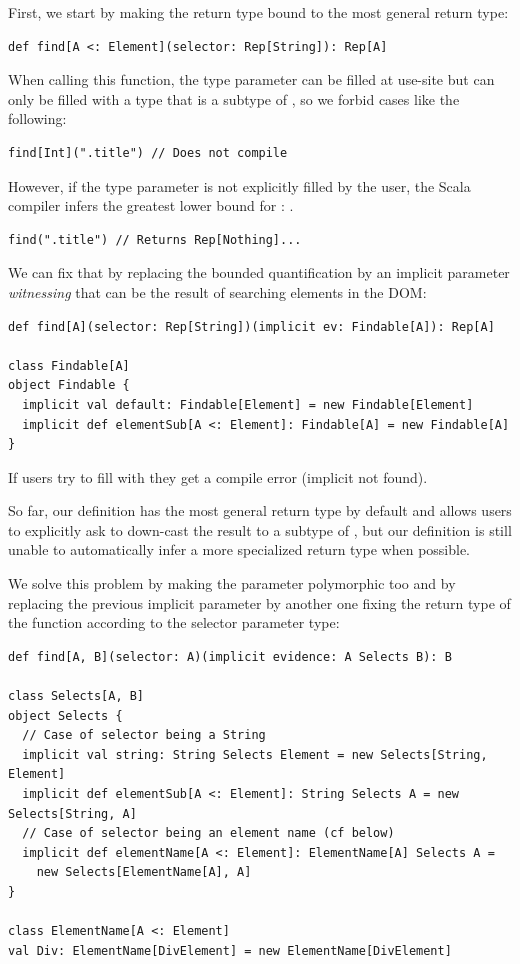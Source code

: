 \documentclass[runningheads,a4paper]{llncs}
\begin{document}
First, we start by making the return type bound to the most general return type:

\begin{lstlisting}
def find[A <: Element](selector: Rep[String]): Rep[A]
\end{lstlisting}

When calling this function, the  type parameter can be filled at use-site but can only be
filled with a type that is a subtype of , so we forbid cases like the following:

\begin{lstlisting}
find[Int](".title") // Does not compile
\end{lstlisting}

However, if the  type parameter is not explicitly filled by the user, the Scala compiler
infers the greatest lower bound for : .

\begin{lstlisting}
find(".title") // Returns Rep[Nothing]...
\end{lstlisting}

We can fix that by replacing the bounded quantification by an implicit parameter \emph{witnessing}
that  can be the result of searching elements in the DOM:

\begin{lstlisting}
def find[A](selector: Rep[String])(implicit ev: Findable[A]): Rep[A]

class Findable[A]
object Findable {
  implicit val default: Findable[Element] = new Findable[Element]
  implicit def elementSub[A <: Element]: Findable[A] = new Findable[A]
}
\end{lstlisting}

If users try to fill  with  they get a compile error (implicit not found).

So far, our definition has the most general return type by default and allows users to explicitly
ask to down-cast the result to a subtype of , but our definition is still unable to
automatically infer a more specialized return type when possible.

We solve this problem by making the  parameter polymorphic too and by replacing the
previous implicit parameter by another one fixing the return type of the function according to the
selector parameter type:

\begin{lstlisting}
def find[A, B](selector: A)(implicit evidence: A Selects B): B

class Selects[A, B]
object Selects {
  // Case of selector being a String
  implicit val string: String Selects Element = new Selects[String, Element]
  implicit def elementSub[A <: Element]: String Selects A = new Selects[String, A]
  // Case of selector being an element name (cf below)
  implicit def elementName[A <: Element]: ElementName[A] Selects A =
    new Selects[ElementName[A], A]
}

class ElementName[A <: Element]
val Div: ElementName[DivElement] = new ElementName[DivElement]
\end{lstlisting}
\end{document}
